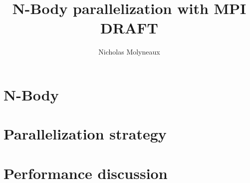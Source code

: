 \documentclass[a4paper,11pt]{article}
\begin{document}
\setlength{\parindent}{0pt}
\setlength{\parskip}{5pt plus 1pt minus 1pt}

\title{N-Body parallelization with MPI\\ DRAFT}
\author{Nicholas Molyneaux}
\vspace{-4cm}
\maketitle



\section{N-Body}

\section{Parallelization strategy}

\section{Performance discussion}

\nocite{*}

\end{document}
